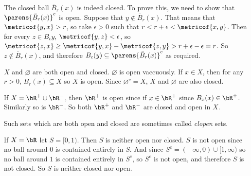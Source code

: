 \documentclass[10pt]{article}
\begin{document}
\begin{exam}

    The closed ball $\bar B_r(x)$ is indeed closed.
    To prove this, we need to show that $\parens{\bar B_r(x)}^c$ is open.
    Suppose that $y\notin\bar B_r(x)$.
    That means that $\metricof{y,x}>r$, so take $\epsilon>0$ such that $r<r+\epsilon<\metricof{x,y}$.
    Then for every $z\in B_\epsilon{y}$, $\metricof{y,z}<\epsilon$, so $\metricof{z,x}\geq\metricof{y,x}-\metricof{z,y}>r+\epsilon-\epsilon=r$.
    So $z\notin\bar B_r(x)$, and therefore $B_\epsilon(y)\subseteq\parens{\bar B_r(x)}^c$ as required.

\end{exam}

\begin{exam}

    $X$ and $\varnothing$ are both open and closed.
    $\varnothing$ is open vaccuously.
    If $x\in X$, then for any $r>0$, $B_r(x)\subseteq X$ so $X$ is open.
    Since $\varnothing^c=X$, $X$ and $\varnothing$ are also closed.

\end{exam}

\begin{exam}

    If $X=\bR^+\cup\bR^-$, then $\bR^+$ is open since if $x\in\bR^+$ since $B_x(x)\in\bR^+$.
    Similarly so is $\bR^-$.
    So both $\bR^+$ and $\bR^-$ are closed and open in $X$.

\end{exam}

Such sets which are both open and closed are sometimes called \emph{clopen} sets.

\begin{exam}

    If $X=\bR$ let $S=[0,1)$.
    Then $S$ is neither open nor closed.
    $S$ is not open since no ball around $0$ is contained entirely in $S$.
    And since $S^c=(-\infty,0)\cup[1,\infty)$ so no ball around $1$ is contained entirely in $S^c$, so $S^c$ is not open, and therefore $S$ is not closed.
    So $S$ is neither closed nor open.

\end{exam}
\end{document}
